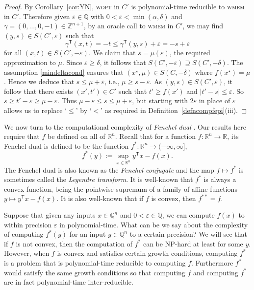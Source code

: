 \documentclass[11pt,reqno]{amsart}
\theoremstyle{definition}
\theoremstyle{remark}
\begin{document}
\begin{proof}
By Corollary~\ref{cor:YN}, \textsc{wopt} in $C'$ is polynomial-time reducible to \textsc{wmem} in $C'$.  Therefore given $\varepsilon \in \mathbb{Q}$ with $0 < \varepsilon < \min(\alpha,\delta)$ and $\gamma=(0,\dots,0,-1)\in \mathbb{Z}^{n+1}$, by an oracle call to \textsc{wmem} in $C'$,
we may find $(y,s)\in S(C',\varepsilon)$ such that 
\[
\gamma^\mathsf{T}(x,t)=-t\le \gamma^\mathsf{T}(y,s)+\varepsilon=-s+\varepsilon
\]
for all $(x,t)\in S(C',-\varepsilon)$. We claim that $s = \mu(\varepsilon)$, the required approximation to $\mu$.
Since $\varepsilon\ge \delta$, it follows that $S(C',-\varepsilon)\supseteq S(C',-\delta)$.  The assumption \eqref{mindeltacond} ensures that $(x^\star, \mu)\in S(C,-\delta)$ where $f(x^\star) = \mu$.
Hence we deduce that $s\le \mu+\varepsilon$, i.e., $\mu\ge s-\varepsilon$.   As $(y,s)\in S(C',\varepsilon)$, it follow that there exists $(x',t')\in C'$ such that 
$t'\ge f(x')$ and $\lvert t'-s\rvert \le \varepsilon$. So $s\ge t'-\varepsilon\ge \mu-\varepsilon$. Thus
$\mu-\varepsilon \le s \le \mu+\varepsilon$, but starting with $2\varepsilon$ in place of $\varepsilon$ allows us to replace `$\le$' by `$<$' as required in Definition~\ref{defncompfepi}(iii).

\end{proof}
 
We now turn to the computational complexity of \emph{Fenchel dual} \cite{Roc}. Our results here require that $f$ be defined on all of $\mathbb{R}^n$.  Recall that for a function $f : \mathbb{R}^n \to \mathbb{R}$, its Fenchel dual is defined to be the function $f^*: \mathbb{R}^n\to (-\infty,\infty]$,
\[
f^*(y):=\sup_{x\in \mathbb{R}^n} y^\mathsf{T} x -f (x).
\]
The Fenchel dual is also known as the \emph{Fenchel conjugate} and the map $f \mapsto f^*$ is sometimes  called the \emph{Legendre transform}. It is well-known that $f^*$ is always a convex function, being the pointwise supremum of a family of affine functions  $y \mapsto y^\mathsf{T}x -f(x)$.  It is  also well-known that if $f$ is convex, then $f^{**}=f$.

Suppose that given any inputs $x \in \mathbb{Q}^n$ and $0 < \varepsilon \in \mathbb{Q}$, we can compute $f(x)$ to within precision $\varepsilon$  in polynomial-time. What can be we say about the complexity of computing $f^*(y)$ for an input $y \in \mathbb{Q}^n$ to a certain precision?  We will see that if $f$ is not convex, then the computation of $f^*$ can be NP-hard at least for some $y$. However, when $f$ is convex and satisfies certain growth conditions, computing $f^*$ is a problem that is polynomial-time reducible to computing $f$. Furthermore $f^*$ would satisfy the same growth conditions so that computing $f$ and computing $f^*$ are in fact polynomial-time inter-reducible.
\end{document}
